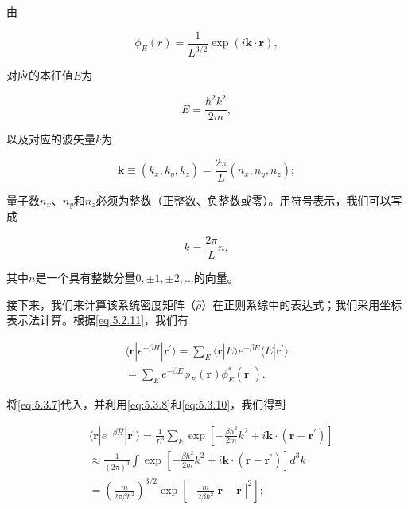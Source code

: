 由

\begin{equation}\tag{5.3.7}\label{eq:5.3.7}
\phi _ { E } ( r ) = \frac { 1 } { L ^{3 / 2} } \exp { ( i \boldsymbol { k } \cdot \boldsymbol { r } ) } ,
\end{equation}

对应的本征值\(E\)为

\begin{equation}\tag{5.3.8}\label{eq:5.3.8}
E = \frac { \hbar ^{2} k ^{2} } { 2 m } ,
\end{equation}

以及对应的波矢量\(k\)为

\begin{equation}\tag{5.3.9}\label{eq:5.3.9}
\pmb { k } \equiv ( k _ { x } , k _ { y } , k _ { z } ) = \frac { 2 \pi } { L } ( n _ { x } , n _ { y } , n _ { z } ) ;
\end{equation}

量子数\(n_{x}\)、\(n_{y}\)和\(n_{z}\)必须为整数（正整数、负整数或零）。用符号表示，我们可以写成

\begin{equation}\tag{5.3.10}\label{eq:5.3.10}
k = \frac { 2 \pi } { L } n ,
\end{equation}

其中\(n\)是一个具有整数分量\(0, \pm1, \pm2, \ldots\)的向量。

接下来，我们来计算该系统密度矩阵（\(\hat{\rho}\)）在正则系综中的表达式；我们采用坐标表示法计算。根据\autoref{eq:5.2.11}，我们有

\begin{equation}\tag{5.3.11}\label{eq:5.3.11}
\begin{array}{r} { \langle \pmb { r } | e ^{- \beta \hat { H} } | \pmb { r } ^{\prime} \rangle = \sum _ { E } \langle \pmb { r } | E \rangle e ^{- \beta E} \langle E | \pmb { r } ^{\prime} \rangle } \\{ = \sum _ { E } e ^{- \beta E} \phi _ { E } ( \pmb { r } ) \phi _ { E } ^{*} ( \pmb { r } ^{\prime} ) . } \end{array}
\end{equation}

将\autoref{eq:5.3.7}代入，并利用\autoref{eq:5.3.8}和\autoref{eq:5.3.10}，我们得到

\begin{equation}\tag{5.3.12}\label{eq:5.3.12}
\begin{array}{rl} & { \langle \pmb { r } | e ^{- \beta \hat { H} } | \pmb { r } ^{\prime} \rangle = \frac { 1 } { L ^{3} } \sum _ { k } \exp \left[ - \frac { \beta \hbar ^{2} } { 2 m } k ^{2} + i \pmb { k } \cdot ( \pmb { r } - \pmb { r } ^{\prime} ) \right] } \\& { \approx \frac { 1 } { ( 2 \pi ) ^{3} } \int \exp \left[ - \frac { \beta \hbar ^{2} } { 2 m } k ^{2} + i \pmb { k } \cdot ( \pmb { r } - \pmb { r } ^{\prime} ) \right] d ^{3} k } \\& { = \left( \frac { m } { 2 \pi \beta \hbar ^{2} } \right) ^{3 / 2} \exp \left[ - \frac { m } { 2 \beta \hbar ^{2} } | \pmb { r } - \pmb { r } ^{\prime} | ^{2} \right] ; } \end{array}
\end{equation}

